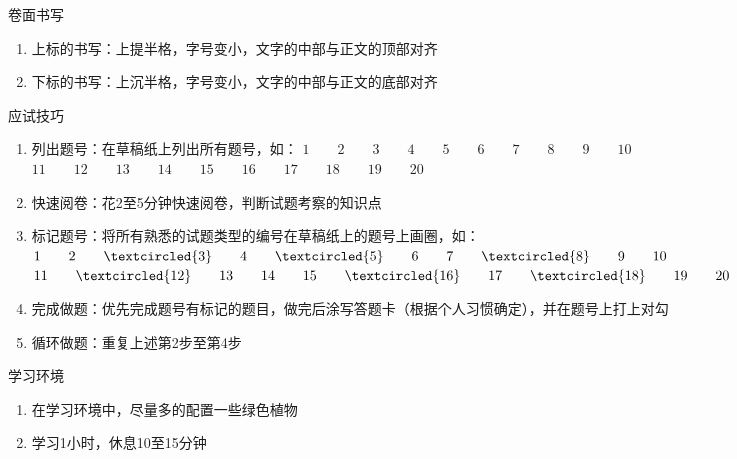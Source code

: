 \documentclass[aspectratio=169]{ctexbeamer} %
\begin{document}
\begin{frame}[t]{卷面书写}
\begin{enumerate}[label={\arabic*.}]
\item 上标的书写：上提半格，字号变小，文字的中部与正文的顶部对齐
\item 下标的书写：上沉半格，字号变小，文字的中部与正文的底部对齐
\end{enumerate}
\end{frame}

\begin{frame}[t]{应试技巧}
\begin{enumerate}[label={\arabic*.}]
\item 列出题号：在草稿纸上列出所有题号，如：
$1 \qquad 2 \qquad 3 \qquad 4 \qquad 5 \qquad 6 \qquad 7 \qquad 8 \qquad 9 \qquad 10$
$11 \qquad 12 \qquad 13 \qquad 14 \qquad 15 \qquad 16 \qquad 17 \qquad 18 \qquad 19 \qquad 20$
\pause
\item 快速阅卷：花2至5分钟快速阅卷，判断试题考察的知识点
\pause
\item 标记题号：将所有熟悉的试题类型的编号在草稿纸上的题号上画圈，如：
$1 \qquad 2 \qquad \textcircled{3} \qquad 4 \qquad \textcircled{5} \qquad 6 \qquad 7 \qquad \textcircled{8} \qquad 9 \qquad 10$
$11 \qquad \textcircled{12} \qquad 13 \qquad 14 \qquad 15 \qquad \textcircled{16} \qquad 17 \qquad \textcircled{18} \qquad 19 \qquad 20$
\pause
\item 完成做题：优先完成题号有标记的题目，做完后涂写答题卡（根据个人习惯确定），并在题号上打上对勾
\pause
\item 循环做题：重复上述第2步至第4步
\end{enumerate}
\end{frame}

\begin{frame}[t]{学习环境}
\begin{enumerate}[label={\arabic*.}]
\item 在学习环境中，尽量多的配置一些绿色植物
\item 学习1小时，休息10至15分钟
\end{enumerate}
\end{frame}
\end{document}
